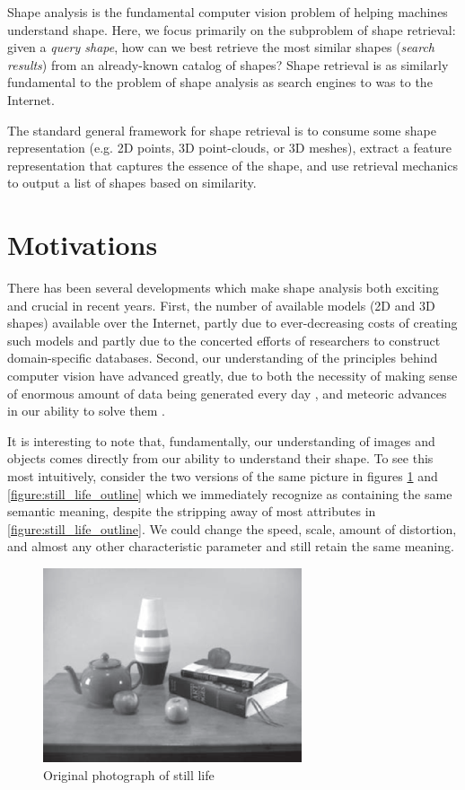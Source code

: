 \documentclass[../tech_report_1.tex]{subfiles}
\begin{document}
Shape analysis is the fundamental computer vision problem of helping machines understand shape. Here, we focus primarily on the subproblem of shape retrieval: given a \textit{query shape}, how can we best retrieve the most similar shapes (\textit{search results}) from an already-known catalog of shapes? Shape retrieval is as similarly fundamental to the problem of shape analysis as search engines to was to the Internet.

The standard general framework for shape retrieval is to consume some shape representation (e.g. 2D points, 3D point-clouds, or 3D meshes), extract a feature representation that captures the essence of the shape, and use retrieval mechanics to output a list of shapes based on similarity.

\section{Motivations}

There has been several developments which make shape analysis both exciting and crucial in recent years. First, the number of available models (2D and 3D shapes) available over the Internet, partly due to ever-decreasing costs of creating such models and partly due to the concerted efforts of researchers to construct domain-specific databases. Second, our understanding of the principles behind computer vision have advanced greatly, due to both the necessity of making sense of enormous amount of data being generated every day \cite{manyika2011big}, and meteoric advances in our ability to solve them \cite{krizhevsky2012imagenet}.

It is interesting to note that, fundamentally, our understanding of images and objects comes directly from our ability to understand their shape. To see this most intuitively, consider the two versions of the same picture in figures \ref{figure:still_life_original} and \ref{figure:still_life_outline} which we immediately recognize as containing the same semantic meaning, despite the stripping away of most attributes in \ref{figure:still_life_outline}. We could change the speed, scale, amount of distortion, and almost any other characteristic parameter and still retain the same meaning.

\begin{figure}[H]
	\centering
	\includegraphics{still_life_full}
	\caption{Original photograph of still life\label{figure:still_life_original}}
\end{figure}
\end{document}
